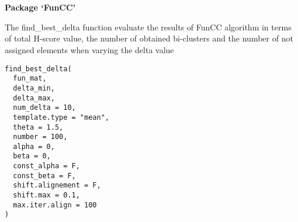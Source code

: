 \documentclass[a4paper]{book}
\begin{document}
\chapter*{}
\begin{center}
{\textbf{\huge Package `FunCC'}}
\par\bigskip{\large \today}
\end{center}
\begin{description}
\raggedright{}
\item[Title]
\item[Version]
\item[Description]
\item[Depends]
\item[License]
\item[Encoding]
\item[LazyData]
\item[RoxygenNote]
\item[Imports]
\end{description}
%
\begin{Description}\relax
The find\_best\_delta function evaluate the results of FunCC algorithm in terms of total H-score value, the number of obtained bi-clusters and the number of not assigned elements when varying the delta value
\end{Description}
%
\begin{Usage}
\begin{verbatim}
find_best_delta(
  fun_mat,
  delta_min,
  delta_max,
  num_delta = 10,
  template.type = "mean",
  theta = 1.5,
  number = 100,
  alpha = 0,
  beta = 0,
  const_alpha = F,
  const_beta = F,
  shift.alignement = F,
  shift.max = 0.1,
  max.iter.align = 100
)
\end{verbatim}
\end{Usage}
%
\end{document}
